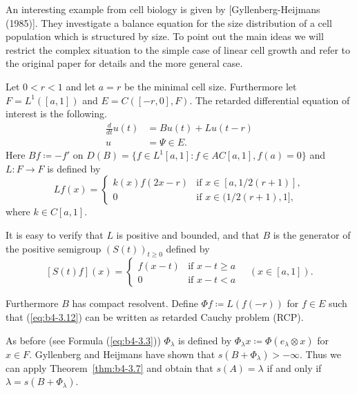 \begin{example}\label{ex:b4-3.12}
	An interesting example from cell biology is given by [Gyllenberg-Heijmans (1985)]. 
	They investigate a balance equation for the size distribution of a cell population which is structured by size. 
	To point out the main ideas we will restrict the complex situation to the simple case of linear cell growth and refer to the original paper for details and the more general case.
	
	Let $0 < r < 1$ and let $a = r$ be the minimal cell size. 
	Furthermore let $F = L^1([a,1])$ and $E = C([-r,0],F)$. 
	The retarded differential equation of interest is the following.
	\begin{equation}\label{eq:b4-3.12}
			\begin{aligned}
		\frac{d}{dt}u(t) &= Bu(t) + Lu(t-r)\\
		u &= \Psi \in E.
		\end{aligned}
	\end{equation}
%
%
%
%
\newpage
%
Here $Bf  \coloneq  -f'$ on $D(B) = \{f \in L^1[a,1] \colon f \in AC[a,1], f(a) = 0\}$ and $L : F \to F$ is defined by
\[
Lf(x) = 
\begin{cases}
	k(x)f(2x-r) & \text{if } x \in [a,1/2(r+1)] , \\
	0 & \text{if } x \in (1/2(r+1),1] ,
\end{cases}
\]
where $k \in C[a,1]$.

It is easy to verify that $L$ is positive and bounded, and that $B$ is the generator of the positive semigroup $(S(t))_{t\geq0}$ defined by
\[
[S(t)f](x) = 
\begin{cases}
	f(x-t) & \text{if } x-t \geq a \\
	0 & \text{if } x-t < a
\end{cases}
\quad (x \in [a,1]).
\]

Furthermore $B$ has compact resolvent. Define $\Phi f  \coloneq  L(f(-r))$ for $f \in E$ such that (\ref{eq:b4-3.12}) can be written as retarded Cauchy problem (RCP).

As before (see Formula (\ref{eq:b4-3.3})) $\Phi_{\lambda}$ is defined by $\Phi_{\lambda}x  \coloneq  \Phi(e_{\lambda}\otimes x)$ for $x \in F$. Gyllenberg and Heijmans have shown that $s(B + \Phi_{\lambda}) > -\infty$. Thus we can apply Theorem~\ref{thm:b4-3.7} and obtain that $s(A) = \lambda$ if and only if $\lambda = s(B + \Phi_{\lambda})$.
\end{example}

